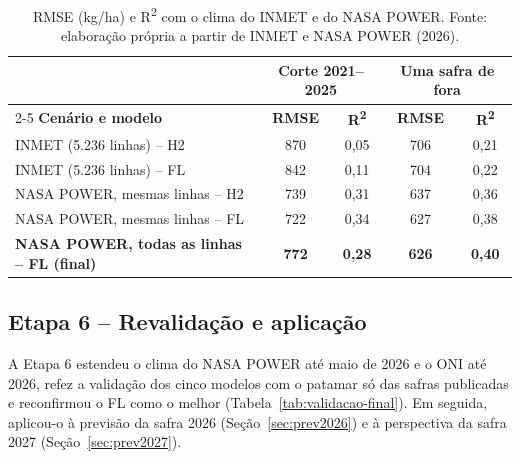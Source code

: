 \documentclass[12pt]{article}
\begin{document}
\begin{table}[ht]
\centering
\caption{RMSE (kg/ha) e R\textsuperscript{2} com o clima do INMET e do
  NASA POWER. Fonte: elaboração própria a partir de INMET e NASA POWER
  (2026).}
\label{tab:nasapower}
\begin{tabular}{|p{6.4cm}|c|c|c|c|}
\hline
 & \multicolumn{2}{c|}{\textbf{Corte 2021--2025}} &
   \multicolumn{2}{c|}{\textbf{Uma safra de fora}} \\ \cline{2-5}
\textbf{Cenário e modelo} & \textbf{RMSE} &
  \textbf{R\textsuperscript{2}} & \textbf{RMSE} &
  \textbf{R\textsuperscript{2}} \\ \hline
INMET (5.236 linhas) -- H2 & 870 & 0,05 & 706 & 0,21 \\ \hline
INMET (5.236 linhas) -- FL & 842 & 0,11 & 704 & 0,22 \\ \hline
NASA POWER, mesmas linhas -- H2 & 739 & 0,31 & 637 & 0,36 \\ \hline
NASA POWER, mesmas linhas -- FL & 722 & 0,34 & 627 & 0,38 \\ \hline
\textbf{NASA POWER, todas as linhas -- FL (final)} & \textbf{772} &
  \textbf{0,28} & \textbf{626} & \textbf{0,40} \\ \hline
\end{tabular}
\end{table}

\subsection{Etapa 6 -- Revalidação e aplicação}

A Etapa 6 estendeu o clima do NASA POWER até maio de 2026 e o ONI até
2026, refez a validação dos cinco modelos com o patamar só das safras
publicadas e reconfirmou o FL como o melhor
(Tabela~\ref{tab:validacao-final}). Em seguida, aplicou-o à previsão da
safra 2026 (Seção~\ref{sec:prev2026}) e à perspectiva da safra 2027
(Seção~\ref{sec:prev2027}).
\end{document}
